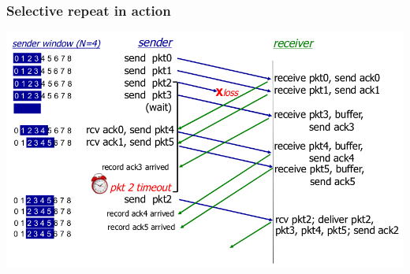 \documentclass{article}[18pt]
\begin{document}
\subsubsection{Selective repeat in action}
\begin{center}
	\includegraphics[scale=0.6]{selective_repeat_action}
\end{center}
\end{document}

